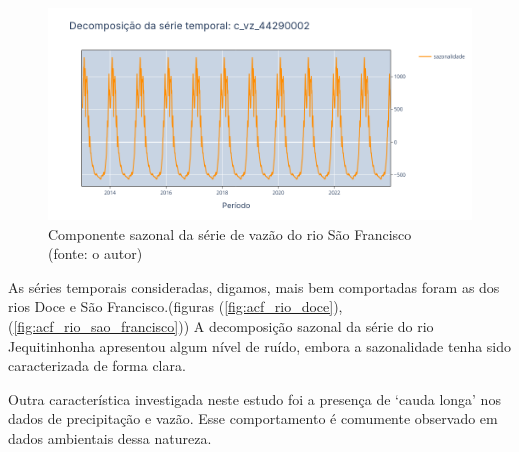 \begin{figure}[!h]
	\centering
	\includegraphics[scale=0.33]{Figuras/rio_sao_francisco/sazonalidade_rio_sao_francisco.png}
	\caption{Componente sazonal da série de vazão do rio São Francisco\\(fonte: o autor)}
	\label{fig:sazonalidade_rio_sao_francisco}
\end{figure}

As séries temporais consideradas, digamos, mais bem comportadas foram as dos rios Doce e São Francisco.(figuras (\ref{fig:acf_rio_doce}), (\ref{fig:acf_rio_sao_francisco})) A decomposição sazonal da série do rio Jequitinhonha apresentou algum nível de ruído, embora a sazonalidade tenha sido caracterizada de forma clara.

%

Outra característica investigada neste estudo foi a presença de `cauda longa' nos dados de precipitação e vazão. Esse comportamento é comumente observado em dados ambientais dessa natureza.\cite{elena_macdonald_2023}

